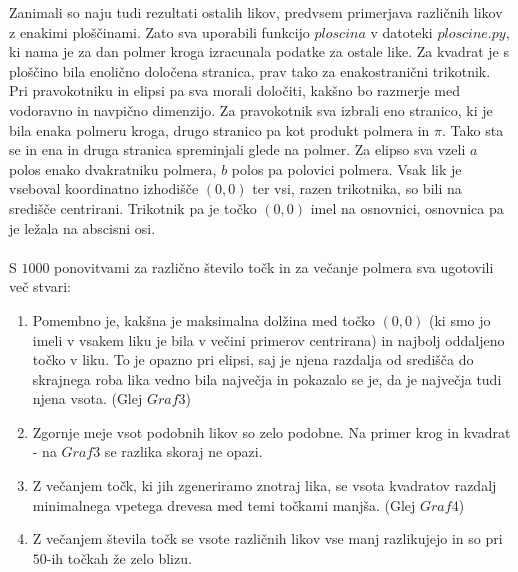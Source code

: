 \documentclass[a4paper]{report}
\begin{document}
Zanimali so naju tudi rezultati ostalih likov, predvsem primerjava različnih likov z enakimi ploščinami. Zato sva uporabili funkcijo $ploscina$ v datoteki \colorbox{gray!10}{$ploscine.py$}, ki nama je za dan polmer kroga izracunala podatke za ostale like.
Za kvadrat je s ploščino bila enolično določena stranica, prav tako za enakostranični trikotnik. Pri pravokotniku in elipsi pa sva morali določiti, kakšno bo razmerje med vodoravno in navpično dimenzijo. Za pravokotnik sva izbrali eno stranico, ki je bila enaka polmeru kroga, drugo stranico pa kot produkt polmera in $\pi$. Tako sta se in ena in druga stranica spreminjali glede na polmer.
Za elipso sva vzeli $a$ polos enako dvakratniku polmera, $b$ polos pa polovici polmera. 
Vsak lik je vseboval koordinatno izhodišče $(0,0)$ ter vsi, razen trikotnika, so bili na središče centrirani. Trikotnik pa je točko $(0,0)$ imel na osnovnici, osnovnica pa je ležala na abscisni osi. \\ \\
S $1000$ ponovitvami za različno število točk in za večanje polmera sva ugotovili več stvari:
\begin{enumerate} 
\item Pomembno je, kakšna je maksimalna dolžina med točko $(0,0)$ (ki smo jo imeli v vsakem liku je bila v večini primerov centrirana) in najbolj oddaljeno točko v liku. To je opazno pri elipsi, saj je njena razdalja od središča do skrajnega roba lika vedno bila največja in pokazalo se je, da je največja tudi njena vsota. (Glej $Graf 3$)
\item Zgornje meje vsot podobnih likov so zelo podobne. Na primer krog in kvadrat - na $Graf 3$ se razlika skoraj ne opazi. 
\item Z večanjem točk, ki jih zgeneriramo znotraj lika, se vsota kvadratov razdalj minimalnega vpetega drevesa med temi točkami manjša. (Glej $Graf 4$)
\item Z večanjem števila točk se vsote različnih likov vse manj razlikujejo in so pri $50$-ih točkah že zelo blizu. 
\end{enumerate}
\end{document}
